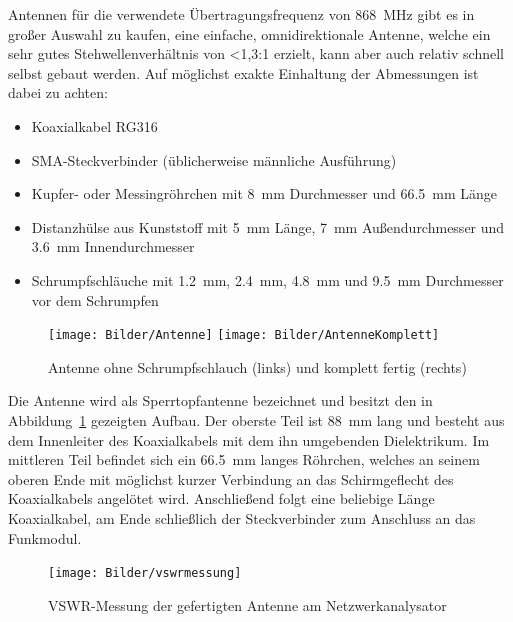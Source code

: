 \documentclass[paper=a4, parskip, numbers=noenddot, toc=listof, headsepline]{scrbook}
\begin{document}
			Antennen für die verwendete Übertragungsfrequenz von \SI{868}{\mega\hertz} gibt es in großer Auswahl zu kaufen, eine einfache, omnidirektionale Antenne, welche ein sehr gutes Stehwellenverhältnis von <1,3:1 erzielt, kann aber auch relativ schnell selbst gebaut werden. Auf möglichst exakte Einhaltung der Abmessungen ist dabei zu achten:
			\begin{itemize}
				\item
				      Koaxialkabel RG316
				\item
				      SMA-Steckverbinder (üblicherweise männliche Ausführung)
				\item
				      Kupfer- oder Messingröhrchen mit \SI{8}{\milli\metre} Durchmesser und \SI{66,5}{\milli\metre} Länge
				\item
				      Distanzhülse aus Kunststoff mit \SI{5}{\milli\metre} Länge, \SI{7}{\milli\metre} Außendurchmesser und \SI{3,6}{\milli\metre} Innendurchmesser
				\item
				      Schrumpfschläuche mit \SI{1,2}{\milli\metre}, \SI{2,4}{\milli\metre}, \SI{4,8}{\milli\metre} und \SI{9,5}{\milli\metre} Durchmesser vor dem Schrumpfen
			\end{itemize}

			\begin{figure}
				\centering
				\texttt{[image: Bilder/Antenne]}%
				\texttt{[image: Bilder/AntenneKomplett]}
				\caption{Antenne ohne Schrumpfschlauch (links) und komplett fertig (rechts)}
				\label{fig:antenne}
			\end{figure}

			Die Antenne wird als Sperrtopfantenne bezeichnet und besitzt den in Abbildung~\ref{fig:antenne} gezeigten Aufbau. Der oberste Teil ist \SI{88}{\milli\metre} lang und besteht aus dem Innenleiter des Koaxialkabels mit dem ihn umgebenden Dielektrikum. Im mittleren Teil befindet sich ein \SI{66,5}{\milli\metre} langes Röhrchen, welches an seinem oberen Ende mit möglichst kurzer Verbindung an das Schirmgeflecht des Koaxialkabels angelötet wird. Anschließend folgt eine beliebige Länge Koaxialkabel, am Ende schließlich der Steckverbinder zum Anschluss an das Funkmodul.

			\begin{figure}[t]
				\centering
				\texttt{[image: Bilder/vswrmessung]}%
				\caption{VSWR-Messung der gefertigten Antenne am Netzwerkanalysator}
				\label{fig:vswrmessung}
			\end{figure}
\end{document}
